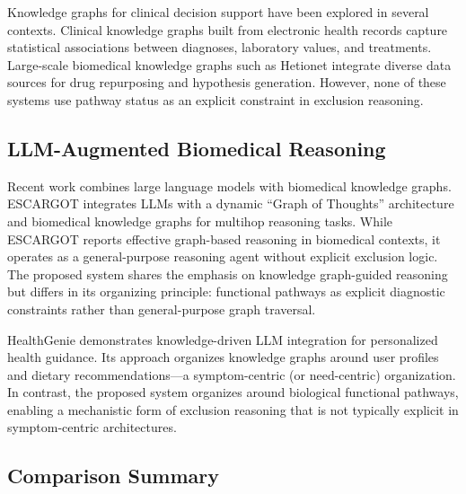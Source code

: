 \documentclass[12pt,a4paper]{article}
\begin{document}
Knowledge graphs for clinical decision support have been explored in several contexts. Clinical knowledge graphs built from electronic health records \citep{Rotmensch2017} capture statistical associations between diagnoses, laboratory values, and treatments. Large-scale biomedical knowledge graphs such as Hetionet \citep{Himmelstein2017} integrate diverse data sources for drug repurposing and hypothesis generation. However, none of these systems use pathway status as an explicit constraint in exclusion reasoning.

\subsection{LLM-Augmented Biomedical Reasoning}

Recent work combines large language models with biomedical knowledge graphs. ESCARGOT \citep{Matsumoto2025} integrates LLMs with a dynamic ``Graph of Thoughts'' architecture and biomedical knowledge graphs for multihop reasoning tasks. While ESCARGOT reports effective graph-based reasoning in biomedical contexts, it operates as a general-purpose reasoning agent without explicit exclusion logic. The proposed system shares the emphasis on knowledge graph-guided reasoning but differs in its organizing principle: functional pathways as explicit diagnostic constraints rather than general-purpose graph traversal.

HealthGenie \citep{Gao2025} demonstrates knowledge-driven LLM integration for personalized health guidance. Its approach organizes knowledge graphs around user profiles and dietary recommendations---a symptom-centric (or need-centric) organization. In contrast, the proposed system organizes around biological functional pathways, enabling a mechanistic form of exclusion reasoning that is not typically explicit in symptom-centric architectures.

\subsection{Comparison Summary}
\end{document}
